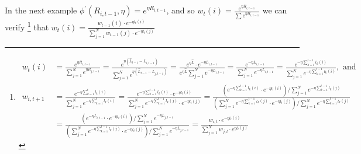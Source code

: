\documentclass[11pt]{article}
\theoremstyle{quest}
\begin{document}
In the next example $\phi^\prime(R_{i,t-1},\eta)= e^{\eta R_{i,t-1}}$, and so $w_{t}(i)=\frac{e^{\eta R_{i,t-1}}}{\sum e^{\eta R_{i,t-1}}}$ we can verify %
\footnote{\begin{align*}
w_{t}(i)&=\frac{e^{\eta R_{i,t-1}}}{\sum_{j=1}^N e^{\eta R_{j,t-1}}}=\frac{e^{\eta (\hat{L}_{t-1}-L_{i,t-1})}}{\sum_{j=1}^N e^{\eta (\hat{L}_{t-1}-L_{j,t-1})}}=\frac{e^{\eta \hat{L}}\cdot e^{-\eta L_{i,t-1}}}{e^{\eta \hat{L}}\sum_{j=1}^N e^{-\eta L_{i,t-1}}}=\frac{e^{-\eta L_{i,t-1}}}{\sum_{j=1}^N e^{-\eta L_{i,t-1}}}=\frac{e^{-\eta \sum_{k=1}^{t-1}l_k(i)}}{\sum_{j=1}^N e^{-\eta \sum_{k=1}^{t-1}l_k(i)}}, \text{ and}\\ 
 w_{i,t+1}&=\frac{e^{-\eta \sum_{k=1}^{t}l_k(i)}}{\sum_{j=1}^N e^{-\eta \sum_{k=1}^{t}l_k(i)}}= \frac{e^{-\eta \sum_{k=1}^{t-1}l_k(i)}\cdot e^{-\eta l_t(i)}}{\sum_{j=1}^N e^{-\eta \sum_{k=1}^{t-1}l_k(j)}\cdot e^{-\eta l_t(j)}}= \frac{(e^{-\eta \sum_{k=1}^{t-1}l_k(i)}\cdot e^{-\eta l_t(i)})/ \sum_{j=1}^N e^{-\eta \sum_{k=1}^{t-1}l_k(j)}}{(\sum_{j=1}^N e^{-\eta \sum_{k=1}^{t-1}l_k(j)}\cdot e^{-\eta l_t(j)})/  \sum_{j=1}^N e^{-\eta \sum_{k=1}^{t-1}l_k(j)}}\\
 &=\frac{(e^{-\eta L_{i,t-1}}\cdot e^{-\eta l_t(i)})/ \sum_{j=1}^N e^{-\eta L_{j,t-1}}}{(\sum_{j=1}^N e^{-\eta \sum_{k=1}^{t-1}l_k(j)}\cdot e^{-\eta l_t(j)})/  \sum_{j=1}^N e^{-\eta L_{j,t-1}}}=\frac{w_{i,t}\cdot e^{-\eta l_t(i)}}{\sum_{j=1}^Nw_{j,t}\cdot e^{\eta l_t(j)}}
 \end{align*}}%
that $w_{t}(i)=\frac{w_{t-1}(i)\cdot e^{-\eta l_t(i)}}{\sum_{j=1}^N w_{t-1}(j)\cdot e^{-\eta l_t(j)}}$
\end{document}
